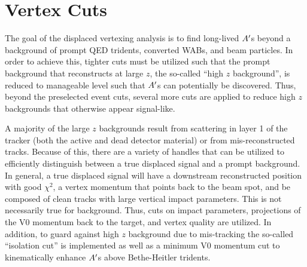 \clearpage

\section{Vertex Cuts}\label{sec:apvertexcuts}

The goal of the displaced vertexing analysis is to find long-lived $A^\prime$s beyond a background of prompt QED tridents, converted WABs, and beam particles. In order to achieve this, tighter cuts must be utilized such that the prompt background that reconstructs at large $z$, the so-called ``high $z$ background'', is reduced to manageable level such that $A^\prime$s can potentially be discovered. Thus, beyond the preselected event cuts, several more cuts are applied to reduce high $z$ backgrounds that otherwise appear signal-like. %

A majority of the large $z$ backgrounds result from scattering in layer 1 of the tracker (both the active and dead detector material) or from  mis-reconstructed tracks. Because of this, there are a variety of handles that can be utilized to efficiently distinguish between a true displaced signal and a prompt background. In general, a true displaced signal will have a downstream reconstructed position with good $\chi^2$, a vertex momentum that points back to the beam spot, and be composed of clean tracks with large vertical impact parameters. This is not necessarily true for background. Thus, cuts on impact parameters, projections of the V0 momentum back to the target, and vertex quality are utilized. In addition, to guard against high $z$ background due to mis-tracking the so-called ``isolation cut'' is implemented as well as a minimum V0 momentum cut to kinematically enhance $A^\prime$s above Bethe-Heitler tridents.

